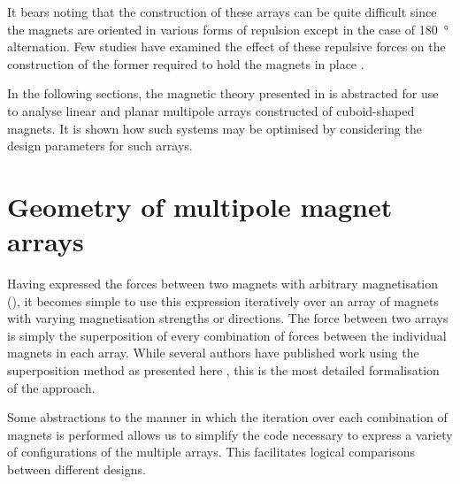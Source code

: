\documentclass[11pt,a4paper]{memoir}
\begin{document}
It bears noting that the construction of these arrays can be quite difficult since the magnets are oriented in various forms of repulsion except in the case of \SI{180}{\degree} alternation.
Few studies have examined the effect of these repulsive forces on the construction of the former required to hold the magnets in place \cite{rovers2009-ietm}.

In the following sections, the magnetic theory presented in  is abstracted for use to analyse linear and planar multipole arrays constructed of cuboid-shaped magnets.
It is shown how such systems may be optimised by considering the design parameters for such arrays.


\section{Geometry of multipole magnet arrays}

Having expressed the forces between two magnets with arbitrary magnetisation (), it becomes simple to use this expression iteratively over an array of magnets with varying magnetisation strengths or directions. The force between two arrays is simply the superposition of every combination of forces between the individual magnets in each array.
While several authors have published work using the superposition method as presented here \cite{allag2009-electromotion,janssen2009-jsdd}, this is the most detailed formalisation of the approach.

Some abstractions to the manner in which the iteration over each combination of magnets is performed allows us to simplify the code necessary to express a variety of configurations of the multiple arrays.
This facilitates logical comparisons between different designs.
\end{document}
